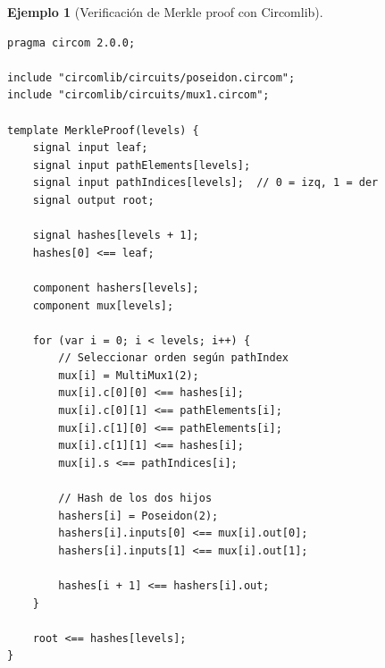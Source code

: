 \documentclass[11pt,a4paper,twoside,openright]{book}
\theoremstyle{definition}
\newtheorem{example}{Ejemplo}[chapter]
\theoremstyle{plain}
\theoremstyle{remark}
\begin{document}
\begin{example}[Verificación de Merkle proof con Circomlib]
\begin{verbatim}
pragma circom 2.0.0;

include "circomlib/circuits/poseidon.circom";
include "circomlib/circuits/mux1.circom";

template MerkleProof(levels) {
    signal input leaf;
    signal input pathElements[levels];
    signal input pathIndices[levels];  // 0 = izq, 1 = der
    signal output root;
    
    signal hashes[levels + 1];
    hashes[0] <== leaf;
    
    component hashers[levels];
    component mux[levels];
    
    for (var i = 0; i < levels; i++) {
        // Seleccionar orden según pathIndex
        mux[i] = MultiMux1(2);
        mux[i].c[0][0] <== hashes[i];
        mux[i].c[0][1] <== pathElements[i];
        mux[i].c[1][0] <== pathElements[i];
        mux[i].c[1][1] <== hashes[i];
        mux[i].s <== pathIndices[i];
        
        // Hash de los dos hijos
        hashers[i] = Poseidon(2);
        hashers[i].inputs[0] <== mux[i].out[0];
        hashers[i].inputs[1] <== mux[i].out[1];
        
        hashes[i + 1] <== hashers[i].out;
    }
    
    root <== hashes[levels];
}
\end{verbatim}
\end{example}
\end{document}
